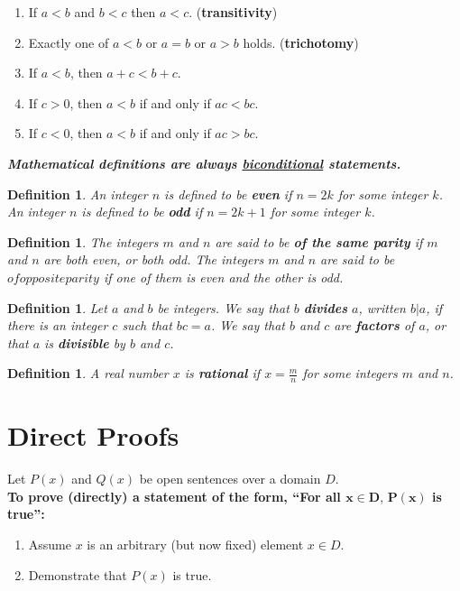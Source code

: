 \documentclass[10pt,reqno]{book}
\theoremstyle{plain}
\newtheorem{definition}[theorem]{Definition}
\begin{document}
	\begin{enumerate}
		\item If $ a < b $ and $ b < c $ then $ a < c $. (\textbf{transitivity})
		\item Exactly one of $ a < b $ or $ a = b $ or $ a > b $ holds. (\textbf{trichotomy})
		\item If $ a < b $, then $ a + c < b + c $.
		\item If $ c > 0 $, then $ a < b $ if and only if $ ac < bc $.
		\item If $ c < 0 $, then $ a < b $ if and only if $ ac > bc $.
	\end{enumerate}

	\begin{center}
		\textbf{\textit{Mathematical definitions are always \underline{biconditional} statements.}}
	\end{center}
	
	\begin{definition}
		An integer $ n $ is defined to be \textbf{even} if $ n = 2k $ for some integer $ k $. An integer $ n $ is defined to be \textbf{odd} if $ n = 2k + 1 $ for some integer $ k $.
	\end{definition}

	\begin{definition}
		The integers $ m $ and $ n $ are said to be \textbf{of the same parity} if $ m $ and $ n $ are both even, or both odd. The integers $ m $ and $ n $ are said to be $ of opposite parity $ if one of them is even and the other is odd.
	\end{definition}

	\begin{definition}
		Let $ a $ and $ b $ be integers. We say that $ b $ \textbf{divides} $ a $, written $ b|a $, if there is an integer $ c $ such that $ bc = a $. We say that $ b $ and $ c $ are \textbf{factors} of $ a $, or that $ a $ is \textbf{divisible} by $ b $ and $ c $.
	\end{definition}

	\begin{definition}
		A real number $ x $ is \textbf{rational} if $ x = \frac{m}{n} $ for some integers $ m $ and $ n $.
	\end{definition}
	
	\section*{Direct Proofs}
	
	Let $ P(x) $ and $ Q(x) $ be open sentences over a domain $ D $.\\
	\textbf{To prove (directly) a statement of the form, ``For all $ \bm{x \in D, \, P(x)} $ is true'':}
	\begin{enumerate}
		\item Assume $ x $ is an arbitrary (but now fixed) element $ x \in D $.
		\item  Demonstrate that $ P(x) $ is true.
	\end{enumerate}
	
\end{document}

